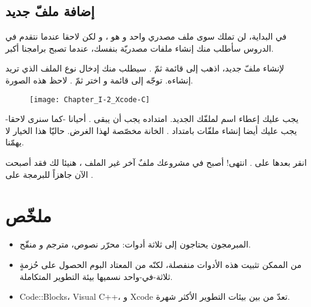 \subsection{إضافة ملفّ جديد}

في البداية، لن تملك سوى ملف مصدري واحد و هو
،
و لكن لاحقا عندما نتقدم في الدروس سأطلب منك إنشاء ملفات مصدريّة بنفسك، عندما تصبح برامجنا أكبر.

لإنشاء ملفّ جديد، اذهب إلى قائمة
ثمّ
.
سيطلب منك إدخال نوع الملف الذي تريد إنشاءه. توجّه إلى قائمة
و اختر
ثمّ
.
لاحظ هذه الصورة.

\begin{figure}[H]
	\centering
	\texttt{[image: Chapter\_I-2\_Xcode-C]}
\end{figure}

يجب عليك إعطاء اسم لملفّك الجديد. امتداده يجب أن يبقى
.
أحيانا -كما سنرى لاحقا- يجب عليك أيضا إنشاء ملفّات بامتداد
.
الخانة
مخصّصة لهذا الغرض. حاليّا هذا الخيار لا يهمّنا.

انقر بعدها على
.
انتهى! أصبح في مشروعك ملفٌ آخر غير الملف
،
هنيئا لك فقد أصبحت الآن جاهزاً للبرمجة على .

\section*{ملخّص}

\begin{itemize}
  \item المبرمجون يحتاجون إلى ثلاثة أدوات: محرّر نصوص، مترجم و منقّح.
  \item من الممكن تثبيت هذه الأدوات منفصلة، لكنّه من المعتاد البوم الحصول على حُزمةٍ ثلاثة-في-واحد نسميها بيئة التطوير المتكاملة.
  \item \textenglish{Code::Blocks}،
\textenglish{Visual C++}،
و
\textenglish{Xcode}
تعدّ من بين بيئات التطوير الأكثر شهرة.
\end{itemize}

